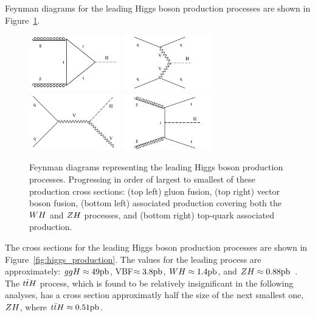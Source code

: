 Feynman diagrams for the leading Higgs boson production processes
are shown in Figure~\ref{fig:higgs_feyn}.

\begin{figure}[htbp]
\centering
     \includegraphics[width=0.35\textwidth]{phenomology_of_processes/plots/feyn_ggH.pdf}
     \includegraphics[width=0.35\textwidth]{phenomology_of_processes/plots/feyn_qqH.pdf}
     \includegraphics[width=0.35\textwidth]{phenomology_of_processes/plots/feyn_VH.pdf}
     \includegraphics[width=0.35\textwidth]{phenomology_of_processes/plots/feyn_ttH.pdf}
     \caption{
Feynman diagrams representing the leading Higgs boson production processes.
Progressing in order of largest to smallest of these production cross sections:
(top left) gluon fusion, (top right) vector boson fusion, (bottom left)
associated production covering both the $WH$ and $ZH$ processes,
and (bottom right) top-quark associated production.
     }
     \label{fig:higgs_feyn}
\end{figure}

The cross sections for the leading Higgs boson production processes
are shown in Figure~\ref{fig:higgs_production}. The values for the leading
process are approximately: $ggH \approx 49\mathrm{pb}$, VBF$ \approx 3.8\mathrm{pb}$, $WH \approx 1.4\mathrm{pb}$,
and $ZH \approx 0.88\mathrm{pb}$~\cite{deFlorian:2016spz}. The $t\bar{t}H$ process,
which is found to be relatively insignificant in the following analyses, has a cross
section approximatly half the size of the next smallest one, $ZH$, where
$t\bar{t}H \approx 0.51\mathrm{pb}$.


